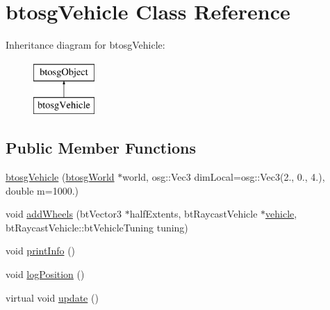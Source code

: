 \hypertarget{classbtosgVehicle}{}\section{btosg\+Vehicle Class Reference}
\label{classbtosgVehicle}
Inheritance diagram for btosg\+Vehicle\+:\begin{figure}[H]
\begin{center}
\leavevmode
\includegraphics[height=2.000000cm]{classbtosgVehicle}
\end{center}
\end{figure}
\subsection*{Public Member Functions}
\begin{DoxyCompactItemize}
\item 
\hyperlink{classbtosgVehicle_a462222cde5a3480b8964b582fcbf39a3}{btosg\+Vehicle} (\hyperlink{classbtosgWorld}{btosg\+World} $\ast$world, osg\+::\+Vec3 dim\+Local=osg\+::\+Vec3(2., 0., 4.), double m=1000.)
\item 
void \hyperlink{classbtosgVehicle_a98971fb952c08cb72341a0c333fc66de}{add\+Wheels} (bt\+Vector3 $\ast$half\+Extents, bt\+Raycast\+Vehicle $\ast$\hyperlink{classbtosgVehicle_ac45b117f8b523f7040de99639deb7522}{vehicle}, bt\+Raycast\+Vehicle\+::bt\+Vehicle\+Tuning tuning)
\item 
void \hyperlink{classbtosgVehicle_abe98f64f0a8f37c7c0b244e3afbbcb15}{print\+Info} ()
\item 
void \hyperlink{classbtosgVehicle_ae9168c62263b26f95d068d94d6a7cab7}{log\+Position} ()
\item 
virtual void \hyperlink{classbtosgVehicle_a5fd0f471df492ac232c9b772a28bd2b9}{update} ()
\end{DoxyCompactItemize}
